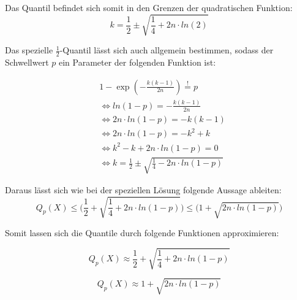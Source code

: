 \documentclass[../main.tex]{subfiles}
\begin{document}
\begin{flushleft}
Das Quantil befindet sich somit in den Grenzen der quadratischen Funktion:
\begin{equation}
 k = \frac{ 1 }{ 2 } \pm \sqrt{ \frac{ 1 }{ 4 } + 2n\cdot ln(2)}
\end{equation}

Das spezielle $ \frac{1}{2} $-Quantil lässt sich auch allgemein bestimmen, sodass der Schwellwert $p$ ein Parameter der folgenden Funktion ist:

\begin{align*}
& 1 - \exp(-\frac{ k(k-1) }{ 2n }) \overset{!}{=} p \\
& \Leftrightarrow ln(1-p) = -\frac{ k(k-1)}{ 2n } \\
& \Leftrightarrow 2n\cdot ln(1-p) = -k(k-1) \\
& \Leftrightarrow 2n\cdot ln(1-p) = -k^{ 2 } + k \\
& \Leftrightarrow k^{ 2 } - k + 2n\cdot ln(1-p) = 0 \\
& \Leftrightarrow k = \frac{ 1 }{ 2 } \pm \sqrt{ \frac{ 1 }{ 4 } - 2n\cdot ln(1-p)}
\end{align*}

Daraus lässt sich wie bei der speziellen Lösung folgende Aussage ableiten:
\begin{equation}
Q_{ p }(X) \leq \bigg( \frac{ 1 }{ 2 } + \sqrt{ \frac{ 1 }{ 4 } + 2n\cdot ln(1-p)} \bigg) \leq \bigg(1+\sqrt{ 2n\cdot ln(1-p) }\bigg)
\end{equation}

Somit lassen sich die Quantile durch folgende Funktionen approximieren:

\begin{equation}
Q_{ p }(X) \approx \frac{ 1 }{ 2 } + \sqrt{ \frac{ 1 }{ 4 } + 2n\cdot ln(1-p)}
\end{equation}

\begin{equation}
Q_{ p }(X) \approx 1+\sqrt{ 2n\cdot ln(1-p) }
\end{equation}







\end{flushleft}
\end{document}
